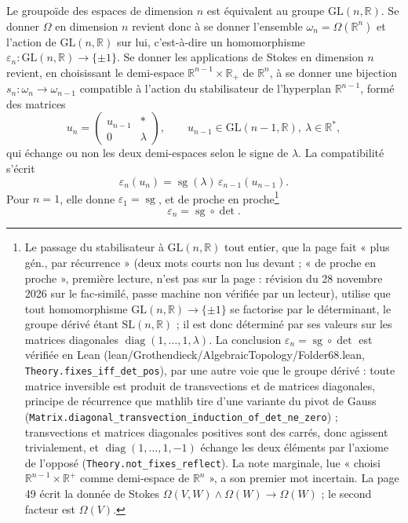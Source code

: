 \documentclass[11pt,a4paper]{article}
\begin{document}
Le groupoïde des espaces de dimension $n$ est équivalent au groupe
$\mathrm{GL}(n, \mathbb{R})$. Se donner $\Omega$ en dimension $n$ revient
donc à se donner l'ensemble $\omega_n = \Omega(\mathbb{R}^n)$ et l'action de
$\mathrm{GL}(n, \mathbb{R})$ sur lui, c'est-à-dire un homomorphisme
$\varepsilon_n : \mathrm{GL}(n, \mathbb{R}) \to \{\pm 1\}$. Se donner les
applications de Stokes en dimension $n$ revient, en choisissant le
demi-espace $\mathbb{R}^{n-1} \times \mathbb{R}_+$ de $\mathbb{R}^n$, à se
donner une bijection $s_n : \omega_n \to \omega_{n-1}$ compatible à l'action
du stabilisateur de l'hyperplan $\mathbb{R}^{n-1}$, formé des matrices
\[
u_n = \begin{pmatrix} u_{n-1} & * \\ 0 & \lambda \end{pmatrix},
\qquad u_{n-1} \in \mathrm{GL}(n-1, \mathbb{R}),\ \lambda \in \mathbb{R}^* ,
\]
qui échange ou non les deux demi-espaces selon le signe de $\lambda$. La
compatibilité s'écrit
\[
\varepsilon_n(u_n) = \operatorname{sg}(\lambda)\, \varepsilon_{n-1}(u_{n-1}).
\]
Pour $n = 1$, elle donne $\varepsilon_1 = \operatorname{sg}$, et de proche en
proche\footnote{Le passage du stabilisateur à $\mathrm{GL}(n, \mathbb{R})$ tout
entier, que la page fait « plus gén., par récurrence » (deux mots courts non
lus devant ; « de proche en proche », première lecture, n'est pas sur la page :
révision du 28 novembre 2026 sur le fac-similé, passe machine non vérifiée par
un lecteur), utilise que tout
homomorphisme $\mathrm{GL}(n, \mathbb{R}) \to \{\pm 1\}$ se factorise par le
déterminant, le groupe dérivé étant $\mathrm{SL}(n, \mathbb{R})$ ; il est
donc déterminé par ses valeurs sur les matrices diagonales
$\operatorname{diag}(1, \ldots, 1, \lambda)$. La conclusion
$\varepsilon_n = \operatorname{sg} \circ \det$ est vérifiée en Lean
(lean/Grothendieck/AlgebraicTopology/Folder68.lean, \texttt{Theory.fixes\_iff\_det\_pos}),
par une autre voie que le groupe dérivé : toute matrice inversible est
produit de transvections et de matrices diagonales, principe de récurrence
que mathlib tire d'une variante du pivot de Gauss
(\texttt{Matrix.diagonal\_transvection\_induction\_of\_det\_ne\_zero}) ;
transvections et matrices diagonales positives sont des carrés, donc agissent
trivialement, et $\operatorname{diag}(1, \ldots, 1, -1)$ échange les deux
éléments par l'axiome de l'opposé (\texttt{Theory.not\_fixes\_reflect}). La note marginale, lue
« choisi $\mathbb{R}^{n-1} \times \mathbb{R}^+$ comme demi-espace de
$\mathbb{R}^n$ », a son premier mot incertain. La page 49 écrit la donnée de
Stokes $\Omega(V, W) \wedge \Omega(W) \to \Omega(W)$ ; le second facteur est
$\Omega(V)$.}
\[
\varepsilon_n = \operatorname{sg} \circ \det .
\]
\end{document}
